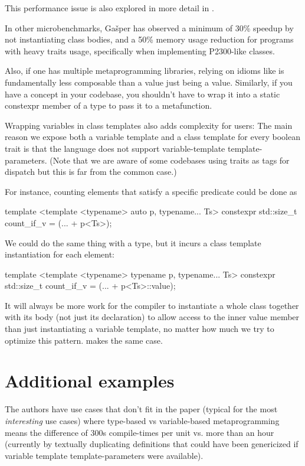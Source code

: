 \documentclass{wg21}
\begin{document}
This performance issue is also explored in more detail in .

In other microbenchmarks, Gašper has observed a minimum of 30\% speedup by not instantiating class bodies, and a 50\% memory usage reduction for programs with heavy traits usage, specifically when implementing P2300-like classes.

Also, if one has multiple metaprogramming libraries, relying on idioms like  is fundamentally less composable than a value just being a value.
Similarly, if you have a concept in your codebase, you shouldn't have to wrap it into a static constexpr  member of a type to pass it to a metafunction.

Wrapping variables in class templates also adds complexity for users: The main reason we expose both a variable template and a class template for every boolean trait is that the language does not support variable-template template-parameters. (Note that we are aware of some codebases using traits as tags for dispatch but this is far from the common case.)

For instance, counting elements that satisfy a specific predicate could be done as

\begin{colorblock}
template <template <typename> auto p, typename... Ts>
constexpr std::size_t count_if_v = (... + p<Ts>);
\end{colorblock}

We could do the same thing with a type, but it incurs a class template instantiation for each element:

\begin{colorblock}
template <template <typename> typename p, typename... Ts>
constexpr std::size_t count_if_v = (... + p<Ts>::value);
\end{colorblock}

It will always be more work for the compiler to instantiate a whole class together with its body (not just its declaration) to allow access to the inner value member than just instantiating a variable template, no matter how much we try to optimize this pattern.  makes the same case.

\section{Additional examples}

The authors have use cases that don't fit in the paper (typical for the most \emph{interesting} use cases) where type-based vs variable-based metaprogramming means the difference of 300s compile-times per unit vs. more than an hour (currently by textually duplicating definitions that could have been genericized if variable template template-parameters were available).
\end{document}
